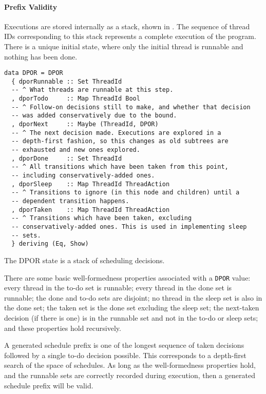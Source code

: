 \paragraph{Prefix Validity}
Executions are stored internally as a stack, shown in .
The sequence of thread IDs corresponding to this stack represents a
complete execution of the program.  There is a unique initial state,
where only the initial thread is runnable and nothing has been done.

\begin{listing}
  \begin{verbatim}
data DPOR = DPOR
  { dporRunnable :: Set ThreadId
  -- ^ What threads are runnable at this step.
  , dporTodo     :: Map ThreadId Bool
  -- ^ Follow-on decisions still to make, and whether that decision
  -- was added conservatively due to the bound.
  , dporNext     :: Maybe (ThreadId, DPOR)
  -- ^ The next decision made. Executions are explored in a
  -- depth-first fashion, so this changes as old subtrees are
  -- exhausted and new ones explored.
  , dporDone     :: Set ThreadId
  -- ^ All transitions which have been taken from this point,
  -- including conservatively-added ones.
  , dporSleep    :: Map ThreadId ThreadAction
  -- ^ Transitions to ignore (in this node and children) until a
  -- dependent transition happens.
  , dporTaken    :: Map ThreadId ThreadAction
  -- ^ Transitions which have been taken, excluding
  -- conservatively-added ones. This is used in implementing sleep
  -- sets.
  } deriving (Eq, Show)
  \end{verbatim}
  \caption{The DPOR state is a stack of scheduling decisions.}\label{lst:dpor}
\end{listing}

There are some basic well-formedness properties associated with a
\verb|DPOR| value: every thread in the to-do set is runnable; every
thread in the done set is runnable; the done and to-do sets are
disjoint; no thread in the sleep set is also in the done set; the
taken set is the done set excluding the sleep set; the next-taken
decision (if there is one) is in the runnable set and not in the to-do
or sleep sets; and these properties hold recursively.

A generated schedule prefix is one of the longest sequence of taken
decisions followed by a single to-do decision possible.  This
corresponds to a depth-first search of the space of schedules.  As
long as the well-formedness properties hold, and the runnable sets are
correctly recorded during execution, then a generated schedule prefix
will be valid.

